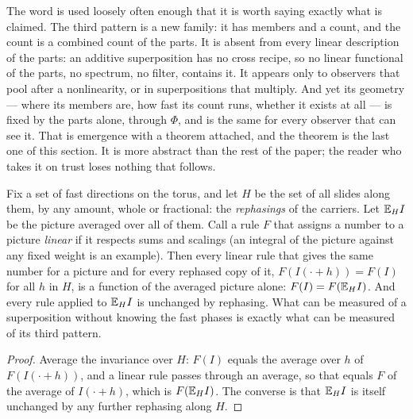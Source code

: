 The word is used loosely often enough that it is worth saying exactly what
is claimed. The third pattern is a new family: it has members and a count,
and the count is a combined count of the parts. It is absent from every
linear description of the parts: an additive superposition has no cross
recipe, so no linear functional of the parts, no spectrum, no filter,
contains it. It appears only to observers that pool after a nonlinearity,
or in superpositions that multiply. And yet its geometry --- where its
members are, how fast its count runs, whether it exists at all --- is fixed
by the parts alone, through $\Phi$, and is the same for every observer that
can see it. That is emergence with a theorem attached, and the theorem is
the last one of this section. It is more abstract than the rest of the
paper; the reader who takes it on trust loses nothing that follows.

\begin{proposition}
\label{prop:invariant}
Fix a set of fast directions on the torus, and let $H$ be the set of all
slides along them, by any amount, whole or fractional: the
\emph{rephasings} of the carriers. Let $\mathbb{E}_HI$ be the picture averaged over
all of them. Call a rule $F$ that assigns a number to a picture
\emph{linear} if it respects sums and scalings (an integral of the picture
against any fixed weight is an example). Then every linear rule that gives
the same number for a picture and for every rephased copy of it,
$F(I(\cdot+h))=F(I)$ for all $h$ in $H$, is a function of the averaged
picture alone: $F(I)=F(\mathbb{E}_HI)$. And every rule applied to $\mathbb{E}_HI$ is
unchanged by rephasing. What can be measured of a superposition without
knowing the fast phases is exactly what can be measured of its third
pattern.
\end{proposition}

\begin{proof}
Average the invariance over $H$: $F(I)$ equals the average over $h$ of
$F(I(\cdot+h))$, and a linear rule passes through an average, so that
equals $F$ of the average of $I(\cdot+h)$, which is $F(\mathbb{E}_HI)$. The
converse is that $\mathbb{E}_HI$ is itself unchanged by any further rephasing along
$H$.
\end{proof}

